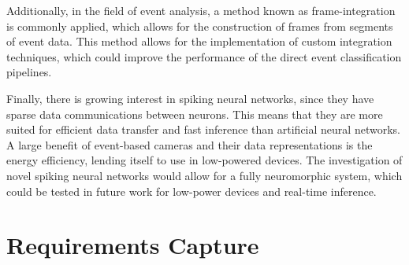 
Additionally, in the field of event analysis, a method known as frame-integration is commonly applied, which allows for the construction of frames from segments of event data. This method allows for the implementation of custom integration techniques, which could improve the performance of the direct event classification pipelines.

Finally, there is growing interest in spiking neural networks, since they have sparse data communications between neurons. This means that they are more suited for efficient data transfer and fast inference than artificial neural networks. A large benefit of event-based cameras and their data representations is the energy efficiency, lending itself to use in low-powered devices. The investigation of novel spiking neural networks would allow for a fully neuromorphic system, which could be tested in future work for low-power devices and real-time inference.

\section{Requirements Capture} \label{sec:requirements_capture}


